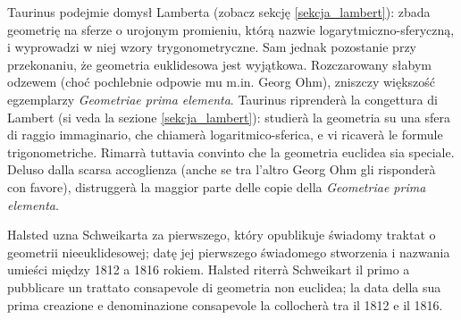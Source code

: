 Taurinus podejmie domysł Lamberta (zobacz sekcję \ref{sekcja_lambert}): zbada geometrię na sferze o urojonym promieniu, którą nazwie logarytmiczno-sferyczną, i wyprowadzi w niej wzory trygonometryczne. %
Sam jednak pozostanie przy przekonaniu, że geometria euklidesowa jest wyjątkowa. %
Rozczarowany słabym odzewem (choć pochlebnie odpowie mu m.in. Georg Ohm), zniszczy większość egzemplarzy \emph{Geometriae prima elementa}. %
Taurinus riprenderà la congettura di Lambert (si veda la sezione \ref{sekcja_lambert}): studierà la geometria su una sfera di raggio immaginario, che chiamerà logaritmico-sferica, e vi ricaverà le formule trigonometriche. %
Rimarrà tuttavia convinto che la geometria euclidea sia speciale. %
Deluso dalla scarsa accoglienza (anche se tra l'altro Georg Ohm gli risponderà con favore), distruggerà la maggior parte delle copie della \emph{Geometriae prima elementa}. %
%

Halsted uzna Schweikarta za pierwszego, który opublikuje świadomy traktat o geometrii nieeuklidesowej; datę jej pierwszego świadomego stworzenia i nazwania umieści między 1812 a 1816 rokiem. %
Halsted riterrà Schweikart il primo a pubblicare un trattato consapevole di geometria non euclidea; la data della sua prima creazione e denominazione consapevole la collocherà tra il 1812 e il 1816. %
%
